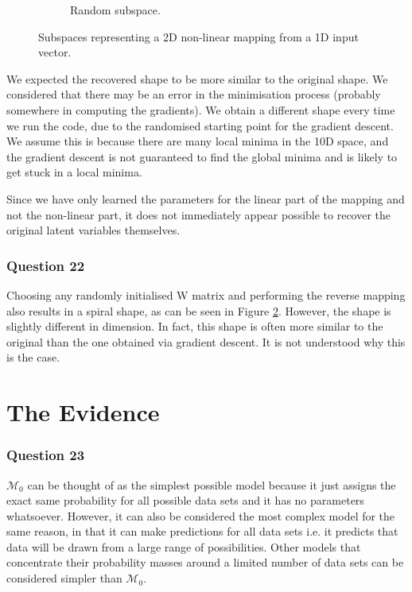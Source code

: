 \documentclass[10pt, a4paper, twocolumn]{article} %
\begin{document}
\begin{figure}[!htb]
\begin{subfigure}{.5\linewidth}
  \caption{Random subspace.}
  \label{fig:q22}
\end{subfigure}
\caption{Subspaces representing a 2D non-linear mapping from a 1D input vector. }
\end{figure}

We expected the recovered shape to be more similar to the original shape. We considered that there may be an error in the minimisation process (probably somewhere in computing the gradients). We obtain a different shape every time we run the code, due to the randomised starting point for the gradient descent. We assume this is because there are many local minima in the 10D space, and the gradient descent is not guaranteed to find the global minima and is likely to get stuck in a local minima.

Since we have only learned the parameters for the linear part of the mapping and not the non-linear part, it does not immediately appear possible to recover the original latent variables themselves.

\subsubsection*{Question 22}

Choosing any randomly initialised W matrix and performing the reverse mapping also results in a spiral shape, as can be seen in Figure \ref{fig:q22}. However, the shape is slightly different in dimension. In fact, this shape is often more similar to the original than the one obtained via gradient descent. It is not understood why this is the case.

\section{The Evidence}

\subsubsection*{Question 23}

$\mathcal{M}_0$ can be thought of as the simplest possible model because it just assigns the exact same probability for all possible data sets and it has no parameters whatsoever. However, it can also be considered the most complex model for the same reason, in that it can make predictions for all data sets i.e. it predicts that data will be drawn from a large range of possibilities. Other models that concentrate their probability masses around a limited number of data sets can be considered simpler than $\mathcal{M}_0$.
\end{document}
